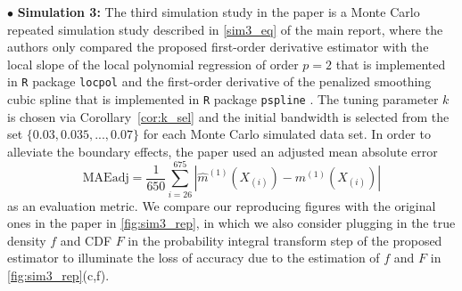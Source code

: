\documentclass{uwstat572}
\theoremstyle{definition}
\renewcommand{\hat}{\widehat}
\theoremstyle{theorem}
\begin{document}
$\bullet$ {\bf Simulation 3:} The third simulation study in the paper \citep{liu2020smoothed} is a Monte Carlo repeated simulation study described in \eqref{sim3_eq} of the main report, where the authors only compared the proposed first-order derivative estimator with the local slope of the local polynomial regression of order $p=2$ that is implemented in \texttt{R} package \texttt{locpol} \citep{locpol2022R} and the first-order derivative of the penalized smoothing cubic spline that is implemented in \texttt{R} package \texttt{pspline} \citep{pspline2022R}. The tuning parameter $k$ is chosen via Corollary~\ref{cor:k_sel} and the initial bandwidth is selected from the set $\{0.03, 0.035,...,0.07\}$ for each Monte Carlo simulated data set. In order to alleviate the boundary effects, the paper used an adjusted mean absolute error 
$$\text{MAEadj}=\frac{1}{650}\sum_{i=26}^{675} \left|\hat{m}^{(1)}(X_{(i)}) -m^{(1)}(X_{(i)}) \right|$$
as an evaluation metric. We compare our reproducing figures with the original ones in the paper in \autoref{fig:sim3_rep}, in which we also consider plugging in the true density $f$ and CDF $F$ in the probability integral transform step of the proposed estimator to illuminate the loss of accuracy due to the estimation of $f$ and $F$ in \autoref{fig:sim3_rep}(c,f).
\end{document}

